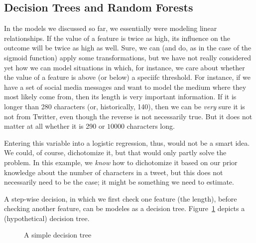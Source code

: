 \subsection{Decision Trees and Random Forests}
In the models we discussed so far, we essentially were modeling linear
relationships. If the value of a feature is twice as high, its
influence on the outcome will be twice as high as well.  Sure, we can
(and do, as in the case of the sigmoid function) apply some
transformations, but we have not really considered yet how we can
model situations in which, for instance, we care about whether the
value of a feature is above (or below) a speciifc threshold.  For
instance, if we have a set of social media messages and want to model
the medium where they most likely come from, then its length is very
important information. If it is longer than 280 characters (or,
historically, 140), then we can be \emph{very} sure it is not from
Twitter, even though the reverse is not necessarily true. But it does
not matter at all whether it is 290 or $10000$ characters long.

Entering this variable into a logistic regression, thus, would not be
a smart idea.  We could, of course, dichotomize it, but that would
only partly solve the problem.  In this example, we \emph{know} how to
dichotomize it based on our prior knowledge about the number of
characters in a tweet, but this does not necessarily need to be the
case; it might be something we need to estimate.

A step-wise decision, in which we first check one feature (the
length), before checking another feature, can be modeles as a decision
tree.  Figure~\ref{fig:decisiontree} depicts a (hypothetical) decision
tree.

\begin{figure}
  \centering
{}
  \caption{\label{fig:decisiontree}A simple decision tree}
\end{figure}

